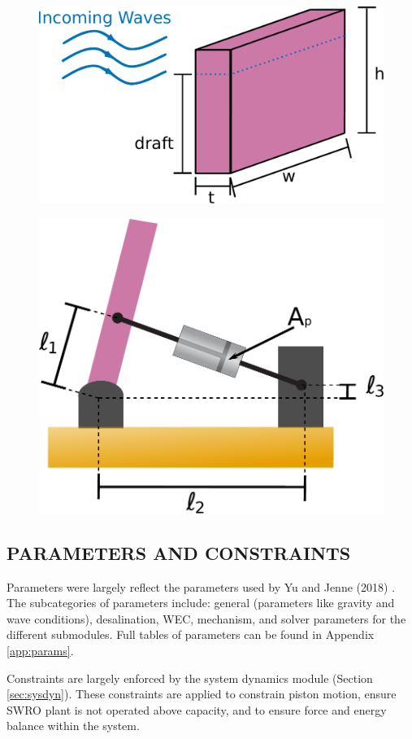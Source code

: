 \documentclass[twocolumn,10pt]{asme2e}
\begin{document}
\begin{figure}
    \centering
    \includegraphics[width=0.7\linewidth]{../figs/WECdims.pdf}
    \label{fig:dims}
\end{figure}

\begin{figure}
    \centering
    \includegraphics[width=0.7\linewidth]{../figs/mechanism.pdf}
    \label{fig:mechanism}
\end{figure}

\subsection{PARAMETERS AND CONSTRAINTS}
Parameters were largely reflect the parameters used by Yu and Jenne (2018) \cite{Yu2018}. The subcategories of parameters include: general (parameters like gravity and wave conditions), desalination, WEC, mechanism, and solver parameters for the different submodules. Full tables of parameters can be found in Appendix \ref{app:params}.

Constraints are largely enforced by the system dynamics module (Section \ref{sec:sysdyn}). These constraints are applied to constrain piston motion, ensure SWRO plant is not operated above capacity, and to ensure force and energy balance within the system.
\end{document}
